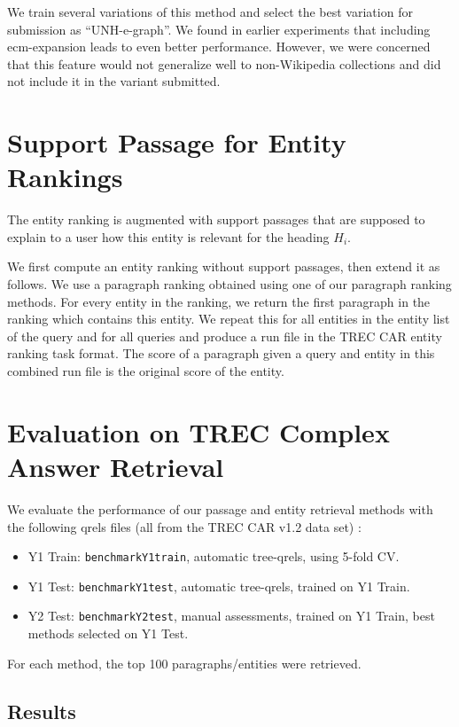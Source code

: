 \documentclass{article}
\begin{document}
We train several variations of this method and select the best variation for submission as ``UNH-e-graph''. We found in earlier experiments that including ecm-expansion leads to even better performance. However, we were concerned that this feature would not generalize well to non-Wikipedia collections and did not include it in the variant submitted.

\section{Support Passage for Entity Rankings}

The entity ranking is augmented with support passages that are supposed to explain to a user how this entity is relevant for the heading $H_i$.

We first compute an entity ranking without support passages, then extend it as follows. We use a paragraph ranking obtained using one of our paragraph ranking methods. For every entity in the ranking, we return the first paragraph in the ranking which contains this entity. We  repeat this for all entities in the entity list of the query and for all queries and produce a run file in the TREC CAR entity ranking task format. The score of a paragraph given a query and entity in this combined run file is the original score of the entity.


\section{Evaluation on TREC Complex Answer Retrieval}


We evaluate the performance of our passage and entity retrieval methods with the following qrels files (all from the TREC CAR v1.2 data set) \cite{trecdata21}:

\begin{itemize}
    \item Y1 Train: \texttt{benchmarkY1train}, automatic tree-qrels, using 5-fold CV.
    \item Y1 Test: \texttt{benchmarkY1test}, automatic tree-qrels, trained on Y1 Train.
    \item Y2 Test: \texttt{benchmarkY2test}, manual assessments, trained on Y1 Train, best methods selected on Y1 Test.
\end{itemize}

For each method, the top 100 paragraphs/entities were retrieved.

\subsection{Results}
\end{document}
